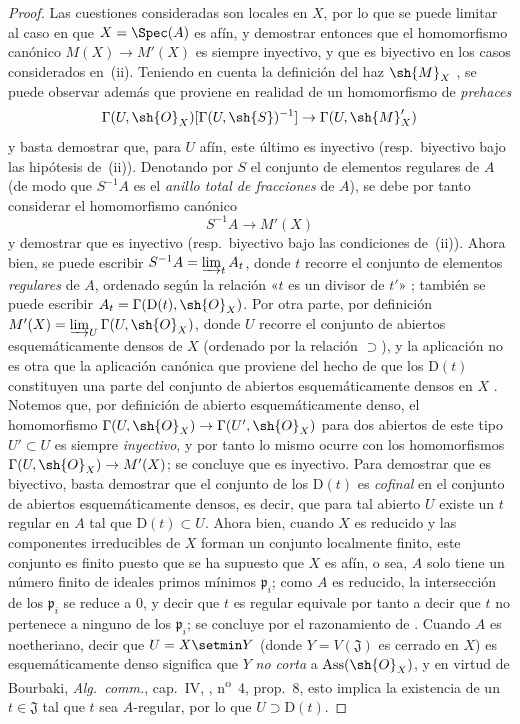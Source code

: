 \begin{proof}
Las cuestiones consideradas son locales en $X$, por lo que se puede limitar al caso en que $X=\Spec(A)$ es afín, y demostrar entonces que el homomorfismo canónico $M(X)\to M'(X)$ es siempre inyectivo, y que es biyectivo en los casos considerados en~(ii).
Teniendo en cuenta la definición del haz $\sh{M}_X$ , se puede observar además que  proviene en realidad de un homomorfismo de \emph{prehaces}
\[
  \Gamma(U,\sh{O}_X)[\Gamma(U,\sh{S})^{-1}]\to\Gamma(U,\sh{M}'_X)
\]
y basta demostrar que, para $U$ afín, este último es inyectivo (resp.\ biyectivo bajo las hipótesis de~(ii)).
Denotando por $S$ el conjunto de elementos regulares de $A$ (de modo que $S^{-1}A$ es el \emph{anillo total de fracciones} de $A$), se debe por tanto considerar el homomorfismo canónico
\[
\label{IV.20.2.11.1}
  S^{-1}A\to M'(X)
  \tag{20.2.11.1}
\]
y demostrar que es inyectivo (resp.\ biyectivo bajo las condiciones de~(ii)).
Ahora bien, se puede escribir $S^{-1}A=\varinjlim_t A_t$, donde $t$ recorre el conjunto de elementos \emph{regulares} de $A$, ordenado según la relación «$t$ es un divisor de $t'$» ; también se puede escribir $A_t=\Gamma(\mathrm{D}(t),\sh{O}_X)$.
Por otra parte, por definición $M'(X)=\varinjlim_U\Gamma(U,\sh{O}_X)$, donde $U$ recorre el conjunto de abiertos esquemáticamente densos de $X$ (ordenado por la relación $\supset$), y la aplicación  no es otra que la aplicación canónica que proviene del hecho de que los $\mathrm{D}(t)$ constituyen una parte del conjunto de abiertos esquemáticamente densos en $X$ .
Notemos que, por definición de abierto esquemáticamente denso, el homomorfismo $\Gamma(U,\sh{O}_X)\to\Gamma(U',\sh{O}_X)$ para dos abiertos de este tipo $U'\subset U$ es siempre \emph{inyectivo}, y por tanto lo mismo ocurre con los homomorfismos $\Gamma(U,\sh{O}_X)\to M'(X)$; se concluye que  es inyectivo.
Para demostrar que  es biyectivo, basta demostrar que el conjunto de los $\mathrm{D}(t)$ es \emph{cofinal} en el conjunto de abiertos esquemáticamente densos, es decir, que para tal abierto $U$ existe un $t$ regular en $A$ tal que $\mathrm{D}(t)\subset U$.
Ahora bien, cuando $X$ es reducido y las componentes irreducibles de $X$ forman un conjunto localmente finito, este conjunto es finito puesto que se ha supuesto que $X$ es afín, o sea, $A$ solo tiene un número finito de ideales primos mínimos $\mathfrak{p}_i$; como $A$ es reducido, la intersección de los $\mathfrak{p}_i$ se reduce a $0$, y decir que $t$ es regular equivale por tanto a decir que $t$ no pertenece a ninguno de los $\mathfrak{p}_i$; se concluye por el razonamiento de .
Cuando $A$ es noetheriano, decir que $U=X\setmin Y$ (donde $Y=V(\mathfrak{J})$ es cerrado en $X$) es esquemáticamente denso significa  que $Y$ \emph{no corta} a $\operatorname{Ass}(\sh{O}_X)$, y en virtud de Bourbaki, \emph{Alg.~comm.}, cap.~IV, , n\textsuperscript{o}~4, prop.~8, esto implica la existencia de un $t\in\mathfrak{J}$ tal que $t$ sea $A$-regular, por lo que $U\supset\mathrm{D}(t)$.


\end{proof}
